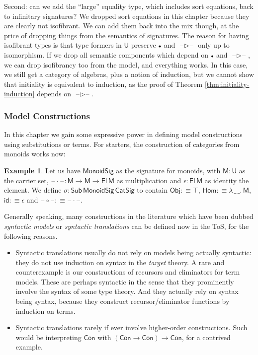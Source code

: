 \documentclass[12pt,a4paper,twoside,openany]{book}
\theoremstyle{remark}
\theoremstyle{definition}
\newtheorem{myexample}{Example}
\theoremstyle{theorem}
\newcommand{\ms}[1]{\mathsf{#1}}
\newcommand{\id}{\mathsf{id}}
\newcommand{\Con}{\mathsf{Con}}
\newcommand{\Sub}{\mathsf{Sub}}
\newcommand{\U}{\mathsf{U}}
\newcommand{\El}{\mathsf{El}}
\newcommand{\blank}{\mathord{\hspace{1pt}\text{--}\hspace{1pt}}}
\newcommand{\ext}{\triangleright}
\newcommand{\emptycon}{\scaleobj{.75}\bullet}
\newcommand{\defn}{:\equiv}
\begin{document}
Second: can we add the ``large'' equality type, which includes sort equations,
back to infinitary signatures? We dropped sort equations in this chapter because
they are clearly not isofibrant. We can add them back into the mix though, at
the price of dropping things from the semantics of signatures. The reason for
having isofibrant types is that type formers in $\U$ preserve $\emptycon$ and
$\blank\!\ext\!\blank$ only up to isomorphism. If we drop all semantic
components which depend on $\emptycon$ and $\blank\!\ext\!\blank$, we can drop
isofibrancy too from the model, and everything works. In this case, we still get
a category of algebras, plus a notion of induction, but we cannot show that
initiality is equivalent to induction, as the proof of Theorem
\ref{thm:initiality-induction} depends on $\blank\!\ext\!\blank$.

\subsubsection{Model Constructions}

In this chapter we gain some expressive power in defining model constructions
using substitutions or terms. For starters, the construction of categories from
monoids works now:

\begin{myexample}
Let us have
$\ms{MonoidSig}$ as the signature for monoids, with $\ms{M} : \U$ as the carrier
set, $\blank\!\cdot\!\blank : \ms{M} \to \ms{M} \to \El\,\ms{M}$ as
multiplication and $\epsilon : \El\,\ms{M}$ as identity the element. We define
$\sigma : \Sub\,\ms{MonoidSig}\,\ms{CatSig}$ to contain $\ms{Obj} \defn \top$,
$\ms{Hom} \defn \lambda\,\_\,\_.\,\ms{M}$, $\id \defn \epsilon$ and
$\blank\!\circ\!\blank \defn \blank\!\cdot\!\blank$.
\end{myexample}

Generally speaking, many constructions in the literature which have been dubbed
\emph{syntactic models} or \emph{syntactic translations} \cite{next700} can be
defined now in the ToS, for the following reasons.
\begin{itemize}
\item
  Syntactic translations usually do not rely on models being actually syntactic:
  they do not use induction on syntax in the \emph{target} theory. A rare and
  counterexample is our constructions of recursors and eliminators for term
  models. These are perhaps syntactic in the sense that they prominently involve
  the syntax of some type theory. And they actually rely on syntax being syntax,
  because they construct recursor/eliminator functions by induction on terms.
\item
  Syntactic translations rarely if ever involve higher-order constructions.
  Such would be interpreting $\Con$ with $(\Con \to \Con) \to \Con$, for a
  contrived example.
\end{itemize}
\end{document}
